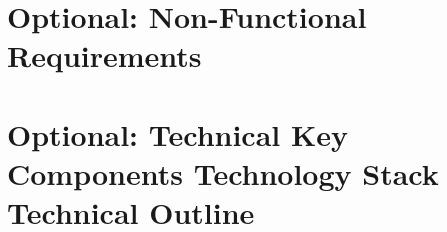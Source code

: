 \documentclass[conference,a4paper]{cs-techrep}
\begin{document}
\section{Optional: Non-Functional Requirements}
\lipsum[3]

\section{Optional: Technical Key Components \textbar{} Technology Stack \textbar{} Technical Outline}
\lipsum[4]


\nocite{ModA-TR-2024SS-CCT-TeamGruen-CloudDice}
\nocite{ModA-TR-2024SS-BCN-TeamCyan-SkillIssue}
\nocite{ModA-TR-2024SS-BCN-TeamGelb-GoalGuru}
\nocite{ModA-TR-2024SS-BCN-TeamWeiss-InfluenzaConnect}
\nocite{ModA-TR-2024SS-BCN-TeamGruen-NanoVend}
\nocite{ModA-TR-2024SS-BCN-TeamRot-StockSentinel}
\nocite{ModA-TR-2024SS-WAE-TeamCyan-Connect4IfYouCan}
\nocite{ModA-TR-2024SS-WAE-TeamWeiss-Geodingens}
\nocite{ModA-TR-2024SS-WAE-TeamGruen-MunchMunch}
\nocite{ModA-TR-2023SS-WAE-TeamWeiss-Neunerln}
\nocite{ModA-TR-2023SS-BDCC-TeamRot-CompVisPipeline}
\nocite{ModA-TR-2023SS-BDCC-TeamBlau-NauticalNonsense}
\nocite{ModA-TR-2023SS-BCN-TeamGruen-TorpedoTactics}
\nocite{ModA-TR-2023SS-BCN-TeamCyan-Stockbird}
\nocite{ModA-TR-2023SS-BCN-TeamBlau-FancyChess}
\nocite{ModA-TR-2023WS-SWT-TeamRot-SGDb}
\nocite{ModA-TR-2023WS-SWT-TeamGruen-OPCUANetzwerk}
\nocite{ModA-TR-2022SS-WAE-TeamWeiss-WoIstMeinGeld}
\nocite{ModA-TR-2022SS-BDCC-TeamWeiss-TwitterDash}
\nocite{ModA-TR-2022SS-BDCC-TeamRot-Reddiment}
\nocite{ModA-TR-2022SS-BDCC-TeamGruen-ExplosionGuy}
\nocite{ModA-TR-2022SS-BDCC-TeamCyan-OTHWiki}
\nocite{ModA-TR-2022WS-SWT-TeamGruen-Graphvio}
\nocite{ModA-TR-2021SS-WAE-TeamWeiss-CovidDashboard}
\nocite{ModA-TR-2021SS-WAE-TeamRot-FireForceDefense}
\nocite{ModA-TR-2021SS-WAE-TeamGruen-MedPlanner}

\sloppy
\printbibliography[notcategory=selfref]
\end{document}
